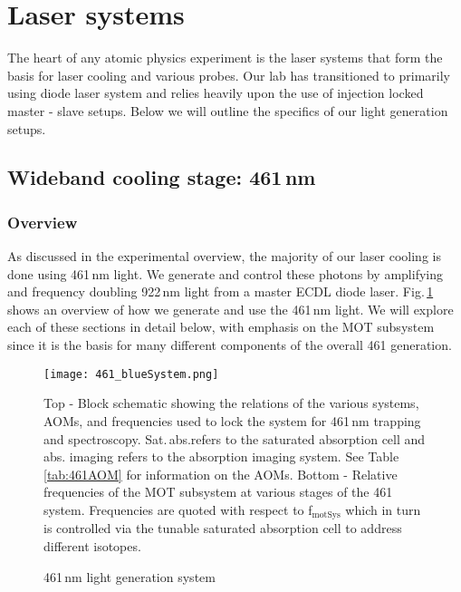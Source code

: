 \pagebreak
\section{Laser systems}\label{sec:laser_systems}
\setcounter{footnote}{0}
The heart of any atomic physics experiment is the laser systems that form the basis for laser cooling and various probes.
Our lab has transitioned to primarily using diode laser system and relies heavily upon the use of injection locked master - slave setups.
Below we will outline the specifics of our light generation setups.

\subsection{Wideband cooling stage: 461\,nm} \label{ssec:461sys}
\subsubsection{Overview}
As discussed in the experimental overview, the majority of our laser cooling is done using 461\,nm light. 
We generate and control these photons by amplifying and frequency doubling 922\,nm light from a master ECDL diode laser. 
Fig.\,\ref{fig:461blockSys} shows an overview of how we generate and use the 461\,nm light.
We will explore each of these sections in detail below, with emphasis on the MOT subsystem since it is the basis for many different components of the overall 461 generation.
	\begin{figure}
		\centerline{
		\texttt{[image: 461\_blueSystem.png]}}
		\caption{461\,nm light generation system}{Top - Block schematic showing the relations of the various systems, AOMs, and frequencies used to lock the system for 461\,nm trapping and spectroscopy. Sat.\,abs.\;refers to the saturated absorption cell and abs. imaging refers to the absorption imaging system. See Table \ref{tab:461AOM} for information on the AOMs. Bottom - Relative frequencies of the MOT subsystem at various stages of the 461 system. Frequencies are quoted with respect to f$_{\text{motSys}}$ which in turn is controlled via the tunable saturated absorption cell to address different isotopes.}
		\label{fig:461blockSys}
	\end{figure} 


